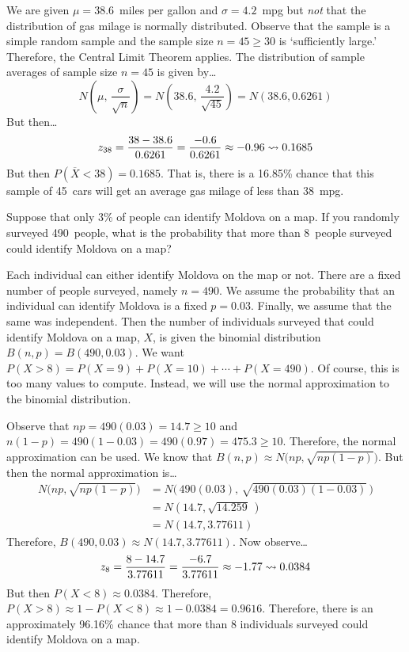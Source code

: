 \documentclass[12pt,letterpaper]{exam}
\begin{document}
\begin{questions}
\sol We are given $\mu= 38.6$~miles per gallon and $\sigma= 4.2$~mpg but \textit{not} that the distribution of gas milage is normally distributed. Observe that the sample is a simple random sample and the sample size $n= 45 \geq 30$ is `sufficiently large.' Therefore, the Central Limit Theorem applies. The distribution of sample averages of sample size $n= 45$ is given by\dots
	\[
	N \left( \mu, \, \dfrac{\sigma}{\sqrt{n}} \right)= N \left( 38.6, \, \dfrac{4.2}{\sqrt{45}} \right)= N(38.6, 0.6261)
	\]
But then\dots
	\[
	z_{38}= \dfrac{38 - 38.6}{0.6261}= \dfrac{-0.6}{0.6261} \approx -0.96 \rightsquigarrow 0.1685
	\]
But then $P(\overline{X} < 38)= 0.1685$. That is, there is a 16.85\% chance that this sample of 45~cars will get an average gas milage of less than 38~mpg. 



\newpage
\question[10] Suppose that only 3\% of people can identify Moldova on a map. If you randomly surveyed 490~people, what is the probability that more than 8~people surveyed could identify Moldova on a map? \pspace

\sol Each individual can either identify Moldova on the map or not. There are a fixed number of people surveyed, namely $n= 490$. We assume the probability that an individual can identify Moldova is a fixed $p= 0.03$. Finally, we assume that the same was independent. Then the number of individuals surveyed that could identify Moldova on a map, $X$, is given the binomial distribution $B(n, p)= B(490, 0.03)$. We want $P(X > 8)= P(X= 9) + P(X= 10) + \cdots + P(X= 490)$. Of course, this is too many values to compute. Instead, we will use the normal approximation to the binomial distribution. \pspace

Observe that $np= 490(0.03)= 14.7 \geq 10$ and $n(1 - p)= 490(1 - 0.03)= 490(0.97)= 475.3 \geq 10$. Therefore, the normal approximation can be used. We know that $B(n, p) \approx N \big(np, \sqrt{np(1 - p)} \big)$. But then the normal approximation is\dots
	\[
	\begin{aligned}
	N \big(np, \sqrt{np(1 - p)} \big)&= N \big( \, 490(0.03), \, \sqrt{490(0.03)(1 - 0.03)} \, \big) \\[0.3cm]
	&= N(14.7, \sqrt{14.259} \,) \\[0.3cm]
	&= N(14.7, 3.77611)
	\end{aligned}
	\]
Therefore, $B(490, 0.03) \approx N(14.7, 3.77611)$. Now observe\dots
	\[
	z_8= \dfrac{8 - 14.7}{3.77611}= \dfrac{-6.7}{3.77611} \approx -1.77 \rightsquigarrow 0.0384
	\]
But then $P(X < 8) \approx 0.0384$. Therefore, $P(X > 8) \approx 1 - P(X < 8) \approx 1 - 0.0384= 0.9616$. Therefore, there is an approximately 96.16\% chance that more than 8 individuals surveyed could identify Moldova on a map. 


\end{questions}
\end{document}
